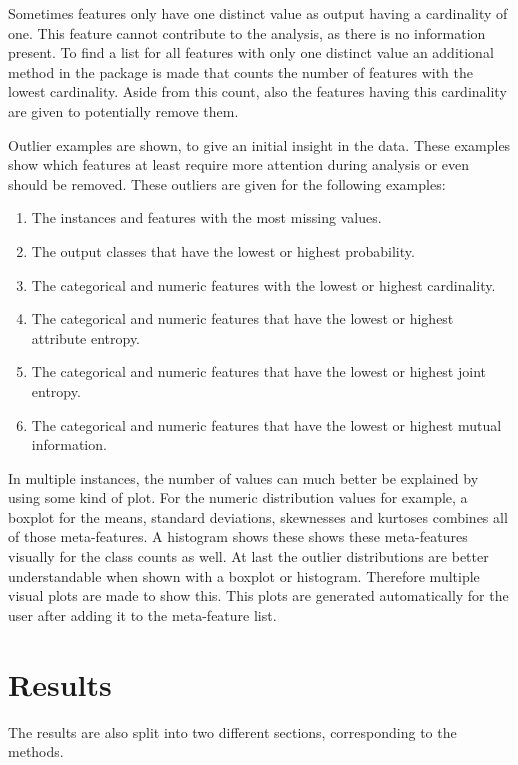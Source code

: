 \documentclass[10pt,a4paper]{report}
\begin{document}
	Sometimes features only have one distinct value as output having a cardinality of one. This feature cannot contribute to the analysis, as there is no information present. To find a list for all features with only one distinct value an additional method in the package is made that counts the number of features with the lowest cardinality. Aside from this count, also the features having this cardinality are given to potentially remove them.
	
	Outlier examples are shown, to give an initial insight in the data. These examples show which features at least require more attention during analysis or even should be removed. These outliers are given for the following examples:
	
	\begin{enumerate}
		\item The instances and features with the most missing values.
		\item The output classes that have the lowest or highest probability.
		\item The categorical and numeric features with the lowest or highest cardinality.
		\item The categorical and numeric features that have the lowest or highest attribute entropy.
		\item The categorical and numeric features that have the lowest or highest joint entropy.
		\item The categorical and numeric features that have the lowest or highest mutual information.
	\end{enumerate}	
	
	In multiple instances, the number of values can much better be explained by using some kind of plot. For the numeric distribution values for example, a boxplot for the means, standard deviations, skewnesses and kurtoses combines all of those meta-features. A histogram shows these shows these meta-features visually for the class counts as well. At last the outlier distributions are better understandable when shown with a boxplot or histogram. Therefore multiple visual plots are made to show this. This plots are generated automatically for the user after adding it to the meta-feature list.
	
	\section{Results}
	\label{DEsec:Results}
	
	The results are also split into two different sections, corresponding to the methods.
	
\end{document}
